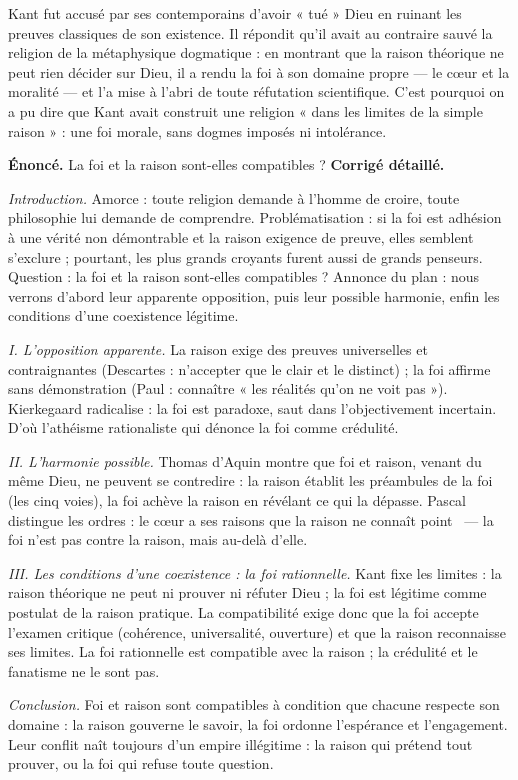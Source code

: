 \documentclass[11pt]{article}
\begin{document}
\begin{savaistu}
Kant fut accusé par ses contemporains d'avoir « tué » Dieu en ruinant les preuves classiques de son existence. Il répondit qu'il avait au contraire sauvé la religion de la métaphysique dogmatique : en montrant que la raison théorique ne peut rien décider sur Dieu, il a rendu la foi à son domaine propre — le cœur et la moralité — et l'a mise à l'abri de toute réfutation scientifique. C'est pourquoi on a pu dire que Kant avait construit une religion « dans les limites de la simple raison » : une foi morale, sans dogmes imposés ni intolérance.
\end{savaistu}

\begin{exoresolu}
\textbf{Énoncé.} La foi et la raison sont-elles compatibles ?
\tcblower
\textbf{Corrigé détaillé.}

\emph{Introduction.} Amorce : toute religion demande à l'homme de croire, toute philosophie lui demande de comprendre. Problématisation : si la foi est adhésion à une vérité non démontrable et la raison exigence de preuve, elles semblent s'exclure ; pourtant, les plus grands croyants furent aussi de grands penseurs. Question : la foi et la raison sont-elles compatibles ? Annonce du plan : nous verrons d'abord leur apparente opposition, puis leur possible harmonie, enfin les conditions d'une coexistence légitime.

\emph{I. L'opposition apparente.} La raison exige des preuves universelles et contraignantes (Descartes : n'accepter que le clair et le distinct) ; la foi affirme sans démonstration (Paul : connaître « les réalités qu'on ne voit pas »). Kierkegaard radicalise : la foi est paradoxe, saut dans l'objectivement incertain. D'où l'athéisme rationaliste qui dénonce la foi comme crédulité.

\emph{II. L'harmonie possible.} Thomas d'Aquin montre que foi et raison, venant du même Dieu, ne peuvent se contredire : la raison établit les préambules de la foi (les cinq voies), la foi achève la raison en révélant ce qui la dépasse. Pascal distingue les ordres : \guillemotleft le cœur a ses raisons que la raison ne connaît point \guillemotright\ — la foi n'est pas contre la raison, mais au-delà d'elle.

\emph{III. Les conditions d'une coexistence : la foi rationnelle.} Kant fixe les limites : la raison théorique ne peut ni prouver ni réfuter Dieu ; la foi est légitime comme postulat de la raison pratique. La compatibilité exige donc que la foi accepte l'examen critique (cohérence, universalité, ouverture) et que la raison reconnaisse ses limites. La foi rationnelle est compatible avec la raison ; la crédulité et le fanatisme ne le sont pas.

\emph{Conclusion.} Foi et raison sont compatibles à condition que chacune respecte son domaine : la raison gouverne le savoir, la foi ordonne l'espérance et l'engagement. Leur conflit naît toujours d'un empire illégitime : la raison qui prétend tout prouver, ou la foi qui refuse toute question.
\end{exoresolu}
\end{document}
